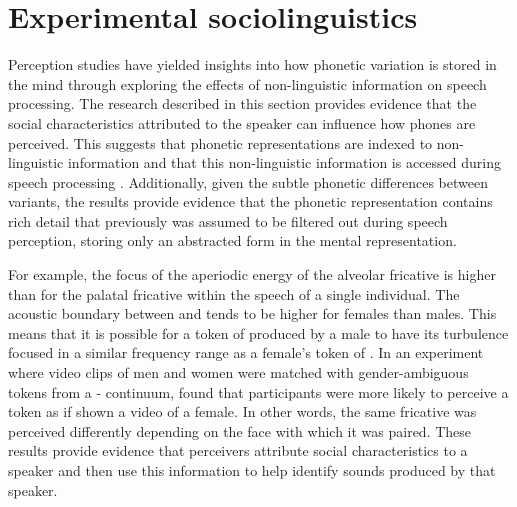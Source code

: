 \section{Experimental sociolinguistics}\label{sec:perception}
Perception studies have yielded insights into how phonetic variation is stored in the mind through exploring the effects of non-lin\-guis\-tic information on speech processing. The research described in this section provides evidence that the social characteristics attributed to the speaker can influence how phones are perceived. This suggests that phonetic representations are indexed to non-lin\-guis\-tic information and that this non-lin\-guis\-tic information is accessed during speech pro\-cessing \citep{strand1999,campbellkibler2007,dragerunderrev}. Additionally, given the subtle phonetic differences between variants, the results provide evidence that the phonetic representation contains rich detail that previously was assumed to be filtered out during speech perception, storing only an abstracted form in the mental representation.

For example, the focus of the aperiodic energy of the alveolar fricative  is higher than for the palatal fricative  within the speech of a single individual. The acoustic boundary between  and  tends to be higher for females than males. This means that it is possible for a token of  produced by a male to have its turbulence focused in a similar frequency range as a female's token of . In an experiment where video clips of men and women were matched with gender-ambiguous tokens from a  -  continuum, \citet{strand1999,strand2000} found that participants were more likely to perceive a token as  if shown a video of a female. In other words, the same fricative was perceived differently depending on the face with which it was paired. These results provide evidence that perceivers attribute social characteristics to a speaker and then use this information to help identify sounds produced by that speaker.

